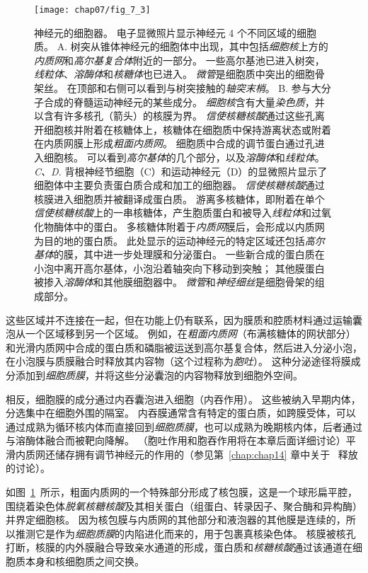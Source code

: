 \begin{figure}[htbp]
	\centering
	\texttt{[image: chap07/fig\_7\_3]}
	\caption{神经元的细胞器。
		电子显微照片显示神经元 4 个不同区域的细胞质\cite{peters1991neuropil}。
		A. 树突从锥体神经元的细胞体中出现，其中包括\textit{细胞核}上方的\textit{内质网}和\textit{高尔基复合体}附近的一部分。
		一些高尔基池已进入树突，\textit{线粒体}、\textit{溶酶体}和\textit{核糖体}也已进入。
		\textit{微管}是细胞质中突出的细胞骨架丝。
		在顶部和右侧可以看到与树突接触的\textit{轴突末梢}。
		B. 参与大分子合成的脊髓运动神经元的某些成分。
		\textit{细胞核}含有大量\textit{染色质}，并以含有许多核孔（箭头）的核膜为界。
		\textit{信使核糖核酸}通过这些孔离开细胞核并附着在核糖体上，核糖体在细胞质中保持游离状态或附着在内质网膜上形成\textit{粗面内质网}。
		细胞质中合成的调节蛋白通过孔进入细胞核。
		可以看到\textit{高尔基体}的几个部分，以及\textit{溶酶体}和\textit{线粒体}。
		\textit{C、D.} 背根神经节细胞（C）和运动神经元（D）的显微照片显示了细胞体中主要负责蛋白质合成和加工的细胞器。
		\textit{信使核糖核酸}通过核膜进入细胞质并被翻译成蛋白质。
		游离多核糖体，即附着在单个\textit{信使核糖核酸}上的一串核糖体，产生胞质蛋白和被导入\textit{线粒体}和过氧化物酶体中的蛋白。
		多核糖体附着于\textit{内质网}膜后，会形成以内质网为目的地的蛋白质。
		此处显示的运动神经元的特定区域还包括\textit{高尔基体}的膜，其中进一步处理膜和分泌蛋白。
		一些新合成的蛋白质在小泡中离开高尔基体，小泡沿着轴突向下移动到突触；
		其他膜蛋白被掺入\textit{溶酶体}和其他膜细胞器中。
		\textit{微管}和\textit{神经细丝}是细胞骨架的组成部分。}
	\label{fig:7_3}
\end{figure}


这些区域并不连接在一起，但在功能上仍有联系，因为膜质和腔质材料通过运输囊泡从一个区域移到另一个区域。
例如，在\textit{粗面内质网}（布满核糖体的网状部分）和光滑内质网中合成的蛋白质和磷脂被运送到高尔基复合体，然后进入分泌小泡，在小泡膜与质膜融合时释放其内容物（这个过程称为\textit{胞吐}）。
这种分泌途径将膜成分添加到\textit{细胞质膜}，并将这些分泌囊泡的内容物释放到细胞外空间。


相反，细胞膜的成分通过内吞囊泡进入细胞（内吞作用）。
这些被纳入早期内体，分选集中在细胞外围的隔室。
内吞膜通常含有特定的蛋白质，如跨膜受体，可以通过成熟为循环核内体而直接回到\textit{细胞质膜}，也可以成熟为晚期核内体，后者通过与溶酶体融合而被靶向降解。
（胞吐作用和胞吞作用将在本章后面详细讨论）平滑内质网还储存拥有调节神经元的作用的（参见第~\ref{chap:chap14} 章中关于~ 释放的讨论）。


如图~\ref{fig:7_3}~所示，粗面内质网的一个特殊部分形成了核包膜，这是一个球形扁平腔，围绕着染色体\textit{脱氧核糖核酸}及其相关蛋白（组蛋白、转录因子、聚合酶和异构酶）并界定细胞核。
因为核包膜与内质网的其他部分和液泡器的其他膜是连续的，所以推测它是作为\textit{细胞质膜}的内陷进化而来的，用于包裹真核染色体。
核膜被核孔打断，核膜的内外膜融合导致亲水通道的形成，蛋白质和\textit{核糖核酸}通过该通道在细胞质本身和核细胞质之间交换。


